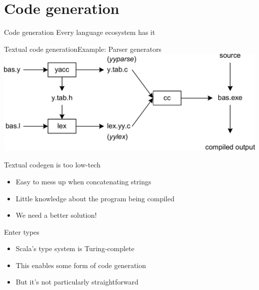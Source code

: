 \documentclass{beamer}
\begin{document}
  \section{Code generation}


\begin{frame}[fragile]{Code generation}
  Every language ecosystem has it
\end{frame}

\begin{frame}[fragile]{Textual code generation}{Example: Parser generators}
  \includegraphics[width=\linewidth]{img/yacc.png}
\end{frame}

\begin{frame}[fragile]{Textual codegen is too low-tech}
  \begin{itemize}
    \item Easy to mess up when concatenating strings
    \item Little knowledge about the program being compiled
    \item We need a better solution!
  \end{itemize}
\end{frame}

\begin{frame}{Enter types}
  \begin{itemize}
    \item Scala's type system is Turing-complete
    \item This enables some form of code generation
    \item But it's not particularly straightforward
  \end{itemize}
\end{frame}
\end{document}
